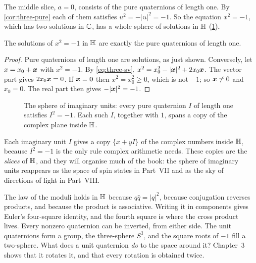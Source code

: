The middle slice, $a=0$, consists of the pure quaternions of length one. By \cref{cor:three-pure} each of them satisfies $u^2=-|u|^2=-1$. So the equation $x^2=-1$, which has two solutions in $\mathbb{C}$, has a whole sphere of solutions in $\mathbb{H}$ (\cref{fig:length-imag}).

\begin{proposition}\label{prop:length-roots}
The solutions of $x^2=-1$ in $\mathbb{H}$ are exactly the pure quaternions of length one.
\end{proposition}

\begin{proof}
Pure quaternions of length one are solutions, as just shown. Conversely, let $x=x_0+\bm{x}$ with $x^2=-1$. By \eqref{eq:three-sv}, $x^2=x_0^2-|\bm{x}|^2+2x_0\bm{x}$. The vector part gives $2x_0\bm{x}=0$. If $\bm{x}=0$ then $x^2=x_0^2\ge0$, which is not $-1$; so $\bm{x}\neq0$ and $x_0=0$. The real part then gives $-|\bm{x}|^2=-1$.
\end{proof}

\begin{figure}[htbp]
  \centering
  \caption{The sphere of imaginary units: every pure quaternion $I$ of length one satisfies $I^2=-1$. Each such $I$, together with $1$, spans a copy of the complex plane inside $\mathbb{H}$.}
  \label{fig:length-imag}
\end{figure}

Each imaginary unit $I$ gives a copy $\{x+yI\}$ of the complex numbers inside $\mathbb{H}$, because $I^2=-1$ is the only rule complex arithmetic needs. These copies are the \emph{slices} of $\mathbb{H}$, and they will organise much of the book: the sphere of imaginary units reappears as the space of spin states in Part~VII and as the sky of directions of light in Part~VIII.

\begin{learned}
The law of the moduli holds in $\mathbb{H}$ because $q\bar q=|q|^2$, because conjugation reverses products, and because the product is associative. Writing it in components gives Euler's four-square identity, and the fourth square is where the cross product lives. Every nonzero quaternion can be inverted, from either side. The unit quaternions form a group, the three-sphere $S^3$, and the square roots of $-1$ fill a two-sphere. What does a unit quaternion \emph{do} to the space around it? Chapter~3 shows that it rotates it, and that every rotation is obtained twice.
\end{learned}

